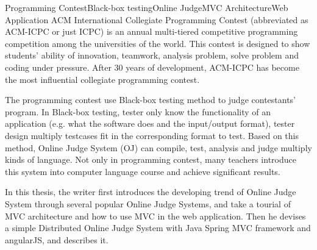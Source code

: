 
\begin{Eabstract}{Programming Contest}{Black-box testing}{Online Judge}{MVC Architecture}{Web Application}
ACM International Collegiate Programming Contest (abbreviated as ACM-ICPC or just ICPC) is an annual multi-tiered competitive programming competition among the universities of the world. This contest is designed to show students' ability of innovation, teamwork, analysis problem, solve problem and coding under pressure. After 30 years of development, ACM-ICPC has become the most influential collegiate programming contest. 

The programming contest use Black-box testing method to judge contestants' program. In Black-box testing, tester only know the functionality of an application (e.g. what the software does and the input/output format), tester design multiply testcases fit in the corresponding format to test. Based on this method, Online Judge System (OJ) can compile, test, analysis and judge multiply kinds of language. Not only in programming contest, many teachers introduce this system into computer language course and achieve significant results.

In this thesis, the writer first introduces the developing trend of Online Judge System through several popular Online Judge Systems, and take a tourial of MVC architecture and how to use MVC in the web application. Then he devises a simple Distributed Online Judge System with Java Spring MVC framework and angularJS, and describes it.
\end{Eabstract}
